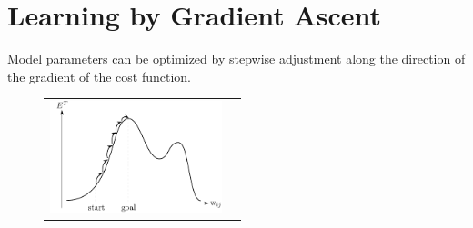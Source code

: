 

\section{Learning by Gradient Ascent}


\begin{frame}{\secname}
Model parameters can be optimized by stepwise adjustment along the direction of the gradient of the cost function. 

\begin{figure}[h]
  \centering
  \begin{tabular}[c c]{c c}
   \includegraphics[width=5cm]{img/section2_fig17}
  &\raisebox{2cm}{$\Delta \mathrm{w}_{ij} = \underbrace{ \eta }_{
    \substack{ \text{learning} \\ \text{rate}} }
  \frac{\partial E^T}{\partial \mathrm{w}_{ij}}$}
  \end{tabular}  
  \label{fig:gradientDescent}
\end{figure}

\end{frame}

